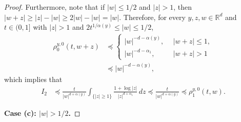 \documentclass[a4paper,11pt]{amsart}
\renewcommand{\le}{\leqslant}
\renewcommand{\ge}{\geqslant}
\newcommand{\R}{\mathds R}
\newcommand{\p}{\preceq}
\newcommand{\A}{\alpha}
\theoremstyle{definition}
\begin{document}
\begin{proof}
Furthermore, note that if $|w|\le {1}/{2}$ and $|z|>1$, then
$
|w{+} z|\ge |z|-|w|\ge 2|w|-|w|=|w|.
$
Therefore, for every $y,z,w\in\R^d$ and $t\in(0,1]$ with $|z|>1$ and $2t^{{1/\A(y)}}\le |w|\le{1}/{2}$,
\begin{align*}
\rho^{y,0}_0(t,w{+} z)& \p
\begin{cases}
|w|^{-d-\A(y)}, \ &\ |w{+} z|\le 1,\\
|w|^{-d-\A_1},\ &\  |w{+} z|> 1
\end{cases}\\
&\p |w|^{-d-\A(y)},
\end{align*}
which implies that
\begin{align*}
I_2&\p \frac{t}{|w|^{d+\A(y)}}
\int_{\{|z|\ge 1\}} \frac{1+\log |z|}{|z|^{d+\A_1}}\,dz\p
\frac{t}{|w|^{d+\A(y)}}\p \rho^{y,0}_1(t,w).
\end{align*}

{\bf{Case (c): $|w|>{1}/{2}$}.}


\end{proof}
\end{document}
